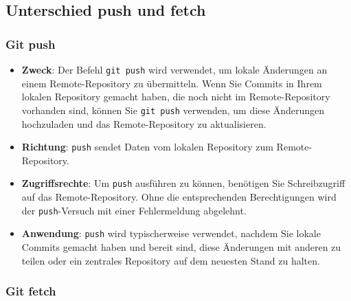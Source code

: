 \documentclass{vorlage-design-main}
\begin{document}
\hypertarget{unterschied-push-und-fetch}{%
\subsection{Unterschied push und
fetch}\label{unterschied-push-und-fetch}}

\hypertarget{git-push}{%
\subsubsection{Git push}\label{git-push}}

\begin{itemize}

\item
  \textbf{Zweck}: Der Befehl \verb|git push| wird
  verwendet, um lokale Änderungen an einem Remote-Repository zu
  übermitteln. Wenn Sie Commits in Ihrem lokalen Repository gemacht
  haben, die noch nicht im Remote-Repository vorhanden sind, können Sie
  \verb|git push| verwenden, um diese Änderungen
  hochzuladen und das Remote-Repository zu aktualisieren.
\item
  \textbf{Richtung}: \verb|push| sendet Daten vom
  lokalen Repository zum Remote-Repository.
\item
  \textbf{Zugriffsrechte}: Um \verb|push| ausführen
  zu können, benötigen Sie Schreibzugriff auf das Remote-Repository.
  Ohne die entsprechenden Berechtigungen wird der
  \verb|push|-Versuch mit einer Fehlermeldung
  abgelehnt.
\item
  \textbf{Anwendung}: \verb|push| wird typischerweise
  verwendet, nachdem Sie lokale Commits gemacht haben und bereit sind,
  diese Änderungen mit anderen zu teilen oder ein zentrales Repository
  auf dem neuesten Stand zu halten.
\end{itemize}

\hypertarget{git-fetch}{%
\subsubsection{Git fetch}\label{git-fetch}}
\end{document}
